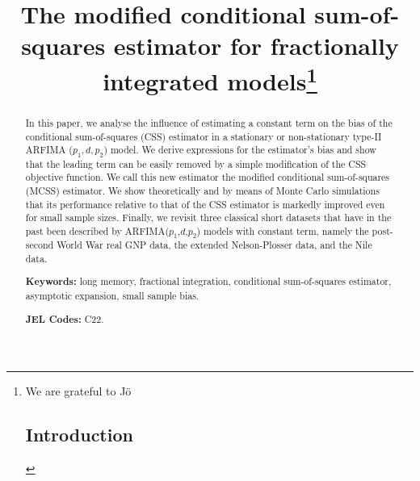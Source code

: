 
\title{The modified conditional sum-of-squares estimator for fractionally integrated models\thanks{We are grateful to J\"{o}
\maketitle



\begin{abstract}
  \noindent In this paper, we analyse the influence of estimating a constant term on the bias of the conditional sum-of-squares (CSS) estimator in a stationary or non-stationary type-II ARFIMA ($p_1, d, p_2$) model.  We derive expressions
  for the estimator's bias and show that the leading term can be easily removed by a simple modification of the CSS objective function. We call this new estimator the modified conditional sum-of-squares (MCSS) estimator. We show
  theoretically and by means of Monte Carlo simulations that its performance relative to that of the CSS estimator is markedly improved even for small sample sizes. Finally, we revisit three classical short datasets that have in
  the past been described by ARFIMA($p_1$,$d$,$p_2$) models with constant term, namely the post-second World War real GNP data, the extended Nelson-Plosser data, and the Nile data.

  \medskip \noindent \textbf{Keywords:} long memory, fractional integration, conditional sum-of-squares estimator, asymptotic expansion, small sample bias.

  \medskip \noindent \textbf{JEL Codes:} C22.

\end{abstract}


\clearpage


\section{Introduction}


}}
